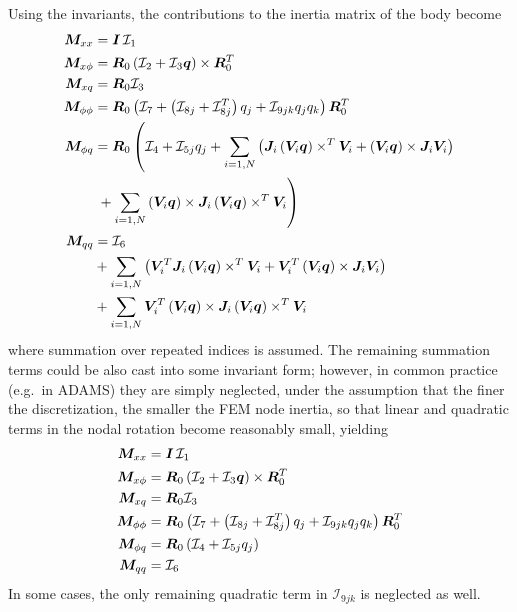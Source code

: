 Using the invariants, the contributions to the inertia matrix of the body
become
\begin{subequations}
\begin{align}
	\bm{M}_{xx}	&= \bm{I} \, \mathcal{I}_1 \\
	\bm{M}_{x\phi}	&= \bm{R}_0 \left( 
		\mathcal{I}_2 + \mathcal{I}_3 \bm{q} \right)\times{}  \bm{R}_0^T \\
	\bm{M}_{xq}	&= \bm{R}_0 \mathcal{I}_3 \\
	\bm{M}_{\phi\phi}&= \bm{R}_0 \left( 
		\mathcal{I}_7
		+ \left( \mathcal{I}_{8j} + \mathcal{I}_{8j}^T \right) q_j
		+ \mathcal{I}_{9jk} q_j q_k
	 \right) \bm{R}_0^T \\
	\bm{M}_{\phi q}	&= \bm{R}_0 \left( 
		\mathcal{I}_4
		+ \mathcal{I}_{5j} q_j 
		+ \sum_{i=1,N} \left( 
			\bm{J}_i \left( \bm{V}_i \bm{q} \right)\times^T \bm{V}_i
			+ \left( \bm{V}_i \bm{q} \right)\times \bm{J}_i \bm{V}_i
		 \right)
	 \right. \nonumber \\
			& \left.  \mbox{} + \sum_{i=1,N} \left( \bm{V}_i \bm{q} \right)\times \bm{J}_i \left( \bm{V}_i \bm{q} \right)\times^T \bm{V}_i
	 \right) \\
	\bm{M}_{qq}	&= \mathcal{I}_6 \nonumber \\
			& \mbox{} + \sum_{i=1,N} \left( 
			\bm{V}_i^T \bm{J}_i \left( \bm{V}_i \bm{q} \right)\times^T \bm{V}_i
			+ \bm{V}_i^T \left( \bm{V}_i \bm{q} \right)\times \bm{J}_i \bm{V}_i
	 \right) \nonumber \\
			& \mbox{} + \sum_{i=1,N}
			\bm{V}_i^T \left( \bm{V}_i \bm{q} \right)\times \bm{J}_i \left( \bm{V}_i \bm{q} \right)\times^T \bm{V}_i
\end{align}
\end{subequations}
where summation over repeated indices is assumed.
The remaining summation terms could be also cast into some invariant form;
however, in common practice (e.g.\ in ADAMS) they are simply neglected,
under the assumption that the finer the discretization, the smaller 
the FEM node inertia, so that linear and quadratic terms 
in the nodal rotation become reasonably small, yielding
\begin{subequations}
\begin{align}
	\bm{M}_{xx}	&= \bm{I} \, \mathcal{I}_1 \\
	\bm{M}_{x\phi}	&= \bm{R}_0 \left( 
		\mathcal{I}_2 + \mathcal{I}_3 \bm{q} \right)\times{}  \bm{R}_0^T \\
	\bm{M}_{xq}	&= \bm{R}_0 \mathcal{I}_3 \\
	\bm{M}_{\phi\phi}&= \bm{R}_0 \left( 
		\mathcal{I}_7
		+ \left( \mathcal{I}_{8j} + \mathcal{I}_{8j}^T \right) q_j
		+ \mathcal{I}_{9jk} q_j q_k
	 \right) \bm{R}_0^T \\
	\bm{M}_{\phi q}	&= \bm{R}_0 \left( 
		\mathcal{I}_4
		+ \mathcal{I}_{5j} q_j 
	 \right) \\
	\bm{M}_{qq}	&= \mathcal{I}_6 
\end{align}
\end{subequations}
In some cases, the only remaining quadratic term in $\mathcal{I}_{9jk}$
is neglected as well.



